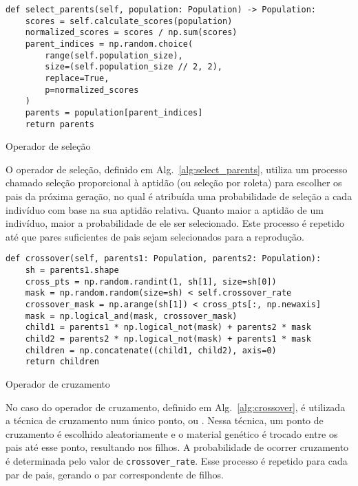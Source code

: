 \begin{listing}[!ht]
    \begin{verbatim}
def select_parents(self, population: Population) -> Population:
    scores = self.calculate_scores(population)
    normalized_scores = scores / np.sum(scores)
    parent_indices = np.random.choice(
        range(self.population_size),
        size=(self.population_size // 2, 2),
        replace=True,
        p=normalized_scores
    )
    parents = population[parent_indices]
    return parents
    \end{verbatim}
    \caption{Operador de seleção}
    \label{alg:select_parents}
\end{listing}

O operador de seleção, definido em Alg.~\ref{alg:select_parents}, utiliza um processo chamado seleção proporcional à aptidão (ou seleção por roleta) para escolher os pais da próxima geração, no qual é atribuída uma probabilidade de seleção a cada indivíduo com base na sua aptidão relativa.
Quanto maior a aptidão de um indivíduo, maior a probabilidade de ele ser selecionado.
Este processo é repetido até que pares suficientes de pais sejam selecionados para a reprodução.

\begin{listing}[!ht]
    \begin{verbatim}
def crossover(self, parents1: Population, parents2: Population):
    sh = parents1.shape
    cross_pts = np.random.randint(1, sh[1], size=sh[0])
    mask = np.random.random(size=sh) < self.crossover_rate
    crossover_mask = np.arange(sh[1]) < cross_pts[:, np.newaxis]
    mask = np.logical_and(mask, crossover_mask)
    child1 = parents1 * np.logical_not(mask) + parents2 * mask
    child2 = parents2 * np.logical_not(mask) + parents1 * mask
    children = np.concatenate((child1, child2), axis=0)
    return children
    \end{verbatim}
    \caption{Operador de cruzamento}
    \label{alg:crossover}
\end{listing}

No caso do operador de cruzamento, definido em Alg.~\ref{alg:crossover}, é utilizada a técnica de cruzamento num único ponto, ou .
Nessa técnica, um ponto de cruzamento é escolhido aleatoriamente e o material genético é trocado entre os pais até esse ponto, resultando nos filhos.
A probabilidade de ocorrer cruzamento é determinada pelo valor de \texttt{crossover\_rate}.
Esse processo é repetido para cada par de pais, gerando o par correspondente de filhos.

